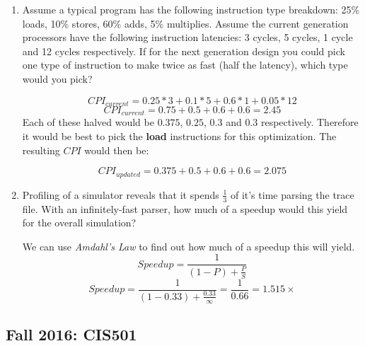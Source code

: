 \documentclass[12pt]{article}
\newenvironment{QandA}{\begin{enumerate}[label=\bfseries\alph*.]\bfseries}
                      {\end{enumerate}}
\newenvironment{answered}{\par\quad\normalfont}{}
\begin{document}
\begin{QandA}
   \item Assume a typical program has the following instruction type breakdown: 25\% loads, 10\% stores, 60\% adds, 5\% multiplies. Assume the current generation processors have the following instruction latencies: 3 cycles, 5 cycles, 1 cycle and 12 cycles respectively. If for the next generation design you could pick one type of instruction to make twice as fast (half the latency), which type would you pick?
        \begin{answered}
        \begin{equation*}
            CPI_{current} = 0.25 * 3 + 0.1 * 5 + 0.6 * 1 + 0.05 * 12
        \end{equation*}
        \begin{equation*}
            CPI_{current} = 0.75 + 0.5 + 0.6 + 0.6 = 2.45
        \end{equation*}
        Each of these halved would be $0.375$, $0.25$, $0.3$ and $0.3$ respectively. Therefore it would be best to pick the \textbf{load} instructions for this optimization. The resulting $CPI$ would then be:
        
        \begin{equation*}
            CPI_{updated} = 0.375 + 0.5 + 0.6 + 0.6 = 2.075
        \end{equation*}
        \end{answered}
        
    \item Profiling of a simulator reveals that it spends $\frac{1}{3}$ of it's time parsing the trace file. With an infinitely-fast parser, how much of a speedup would this yield for the overall simulation?
        \begin{answered}
        We can use \textit{Amdahl's Law} to find out how much of a speedup this will yield.
        \begin{equation*}
            Speedup = \frac{1}{(1-P) + \frac{P}{S}}
        \end{equation*}
        \begin{equation*}
            Speedup = \frac{1}{(1-0.33) + \frac{0.33}{\infty}} = \frac{1}{0.66} = 1.515 \times 
        \end{equation*}        
        \end{answered}
\end{QandA}

\subsection{Fall 2016: CIS501}
\end{document}
